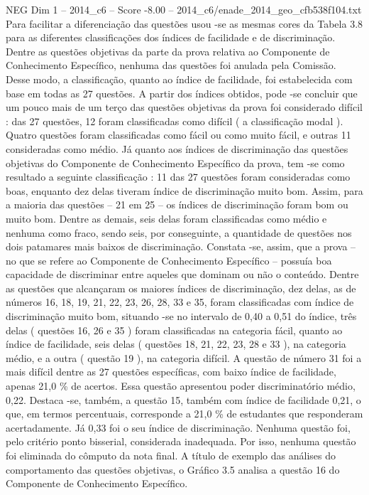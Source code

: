 \begin{textsample}{NEG Dim 1 – 2014\_c6 – Score -8.00 – 2014\_c6/enade\_2014\_geo\_cfb538f104.txt}
Para facilitar a diferenciação das questões usou -se as mesmas cores da Tabela 3.8 para as diferentes classificações dos índices de facilidade e de discriminação.
Dentre as questões objetivas da parte da prova relativa ao Componente de Conhecimento Específico, nenhuma das questões foi anulada pela Comissão.
Desse modo, a classificação, quanto ao índice de facilidade, foi estabelecida com base em todas as 27 questões.
A partir dos índices obtidos, pode -se concluir que um pouco mais de um terço das questões objetivas da prova foi considerado difícil : das 27 questões, 12 foram classificadas como difícil ( a classificação modal ).
Quatro questões foram classificadas como fácil ou como muito fácil, e outras 11 consideradas como médio.
Já quanto aos índices de discriminação das questões objetivas do Componente de Conhecimento Específico da prova, tem -se como resultado a seguinte classificação : 11 das 27 questões foram consideradas como boas, enquanto dez delas tiveram índice de discriminação muito bom.
Assim, para a maioria das questões – 21 em 25 – os índices de discriminação foram bom ou muito bom.
Dentre as demais, seis delas foram classificadas como médio e nenhuma como fraco, sendo seis, por conseguinte, a quantidade de questões nos dois patamares mais baixos de discriminação.
Constata -se, assim, que a prova – no que se refere ao Componente de Conhecimento Específico – possuía boa capacidade de discriminar entre aqueles que dominam ou não o conteúdo.
Dentre as questões que alcançaram os maiores índices de discriminação, dez delas, as de números 16, 18, 19, 21, 22, 23, 26, 28, 33 e 35, foram classificadas com índice de discriminação muito bom, situando -se no intervalo de 0,40 a 0,51 do índice, três delas ( questões 16, 26 e 35 ) foram classificadas na categoria fácil, quanto ao índice de facilidade, seis delas ( questões 18, 21, 22, 23, 28 e 33 ), na categoria médio, e a outra ( questão 19 ), na categoria difícil.
A questão de número 31 foi a mais difícil dentre as 27 questões específicas, com baixo índice de facilidade, apenas 21,0 \% de acertos.
Essa questão apresentou poder discriminatório médio, 0,22.
Destaca -se, também, a questão 15, também com índice de facilidade 0,21, o que, em termos percentuais, corresponde a 21,0 \% de estudantes que responderam acertadamente.
Já 0,33 foi o seu índice de discriminação.
Nenhuma questão foi, pelo critério ponto bisserial, considerada inadequada.
Por isso, nenhuma questão foi eliminada do cômputo da nota final.
A título de exemplo das análises do comportamento das questões objetivas, o Gráfico 3.5 analisa a questão 16 do Componente de Conhecimento Específico.

\end{textsample}
